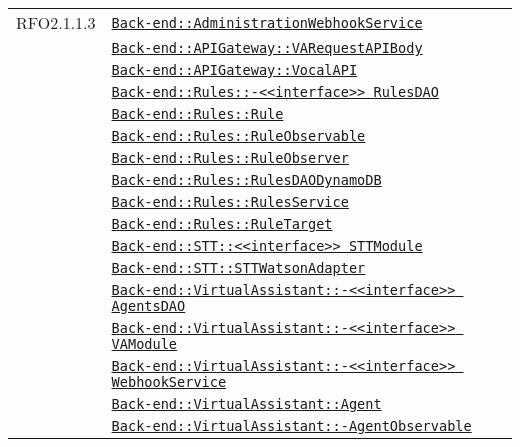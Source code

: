 \begin{longtable}{|>{\centering}m{3cm}|m{10cm}<{\centering}|}
RFO2.1.1.3 & \hyperref[Back-end::AdministrationWebhookService]{\texttt{Back-end::AdministrationWebhookService}}\\
& \hyperref[Back-end::APIGateway::VARequestAPIBody]{\texttt{Back-end::APIGateway::VARequestAPIBody}}\\
& \hyperref[Back-end::APIGateway::VocalAPI]{\texttt{Back-end::APIGateway::VocalAPI}}\\
& \hyperref[Back-end::Rules::<<interface>> RulesDAO]{\texttt{Back-end::Rules::-\linebreak <<interface>> RulesDAO}}\\
& \hyperref[Back-end::Rules::Rule]{\texttt{Back-end::Rules::Rule}}\\
& \hyperref[Back-end::Rules::RuleObservable]{\texttt{Back-end::Rules::RuleObservable}}\\
& \hyperref[Back-end::Rules::RuleObserver]{\texttt{Back-end::Rules::RuleObserver}}\\
& \hyperref[Back-end::Rules::RulesDAODynamoDB]{\texttt{Back-end::Rules::RulesDAODynamoDB}}\\
& \hyperref[Back-end::Rules::RulesService]{\texttt{Back-end::Rules::RulesService}}\\
& \hyperref[Back-end::Rules::RuleTarget]{\texttt{Back-end::Rules::RuleTarget}}\\
& \hyperref[Back-end::STT::<<interface>> STTModule]{\texttt{Back-end::STT::<<interface>> STTModule}}\\
& \hyperref[Back-end::STT::STTWatsonAdapter]{\texttt{Back-end::STT::STTWatsonAdapter}}\\
& \hyperref[Back-end::VirtualAssistant::<<interface>> AgentsDAO]{\texttt{Back-end::VirtualAssistant::-\linebreak <<interface>> AgentsDAO}}\\
& \hyperref[Back-end::VirtualAssistant::<<interface>> VAModule]{\texttt{Back-end::VirtualAssistant::-\linebreak <<interface>> VAModule}}\\
& \hyperref[Back-end::VirtualAssistant::<<interface>> WebhookService]{\texttt{Back-end::VirtualAssistant::-\linebreak <<interface>> WebhookService}}\\
& \hyperref[Back-end::VirtualAssistant::Agent]{\texttt{Back-end::VirtualAssistant::Agent}}\\
& \hyperref[Back-end::VirtualAssistant::AgentObservable]{\texttt{Back-end::VirtualAssistant::-\linebreak AgentObservable}}\\

\end{longtable}
